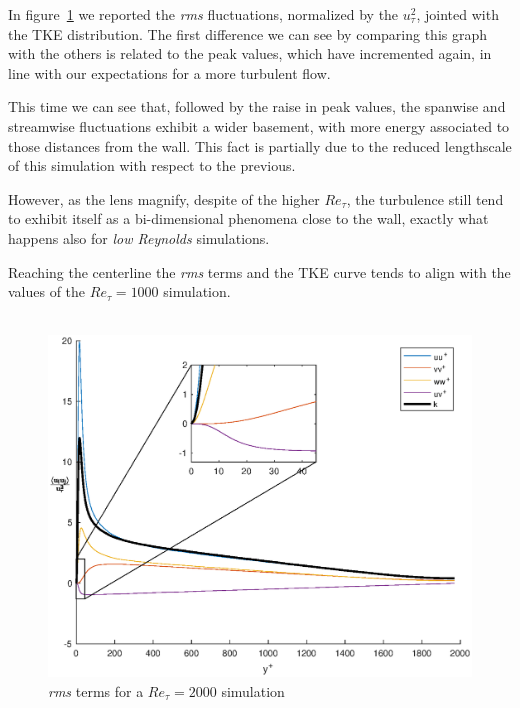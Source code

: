 In figure~\ref{budget:2000} we reported the \emph{rms} fluctuations, normalized by the $u_{\tau}^{2}$, jointed with the TKE distribution. The first difference we can see by comparing this graph with the others is related to the peak values, which have incremented again, in line with our expectations for a more turbulent flow. \par
This time we can see that, followed by the raise in peak values, the spanwise and streamwise fluctuations exhibit a wider basement, with more energy   associated to those distances from the wall. This fact is partially due to the reduced lengthscale of this simulation with respect to the previous.\par
However, as the lens magnify, despite of the higher $Re_{\tau}$, the turbulence still tend to exhibit itself as a bi-dimensional phenomena close to the wall, exactly what happens also for \emph{low Reynolds} simulations.\par

Reaching the centerline the \emph{rms} terms and the TKE curve tends to align with the values of the $Re_{\tau}=1000$ simulation.\\~\par

\begin{figure}
\begin{center}
\includegraphics[scale=0.55]{grafici/budget+k_2000.eps}
\caption{\emph{rms} terms for a $Re_{\tau}=2000$ simulation}
\label{budget:2000}
\end{center} 
\end{figure}


